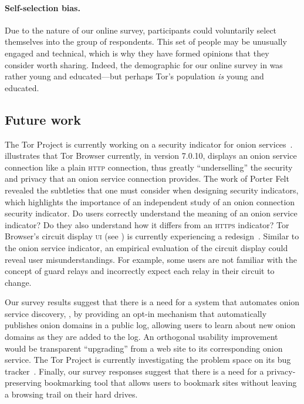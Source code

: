 \paragraph{Self-selection bias.}
Due to the nature of our online survey, participants could voluntarily select
themselves into the group of respondents.  This set of people may be unusually
engaged and technical, which is why they have formed opinions that they
consider worth sharing.  Indeed, the demographic for our online survey in
 was rather young and educated---but perhaps Tor's
population \emph{is} young and educated.

\subsection{Future work}
\label{sec:future-work}

The Tor Project is currently working on a security indicator for onion
services~\cite{trac23247}.   illustrates that Tor
Browser currently, in version 7.0.10, displays an onion service connection like
a plain \textsc{http} connection, thus greatly ``underselling'' the security and
privacy that an onion service connection provides.  The work of Porter Felt
\ea~\cite{Felt2016a} revealed the subtleties that one must consider when
designing security indicators, which highlights the importance of an independent
study of an onion connection security indicator.  Do users correctly understand
the meaning of an onion service indicator?  Do they also understand how it
differs from an \textsc{https} indicator?  Tor Browser's circuit display
\textsc{ui} (see ) is currently experiencing a
redesign~\cite{trac24309}.  Similar to the onion service indicator, an empirical
evaluation of the circuit display could reveal user misunderstandings.  For
example, some users are not familiar with the concept of guard relays and
incorrectly expect each relay in their circuit to change.

Our survey results suggest that there is a need for a system that automates
onion service discovery, \eg, by providing an opt-in mechanism that
automatically publishes onion domains in a public log, allowing users to learn
about new onion domains as they are added to the log.  An orthogonal usability
improvement would be transparent ``upgrading'' from a web site to its
corresponding onion service.  The Tor Project is currently investigating the
problem space on its bug tracker~\cite{trac21952}.  Finally, our survey
responses suggest that there is a need for a privacy-preserving bookmarking tool
that allows users to bookmark sites without leaving a browsing trail on their
hard drives.
